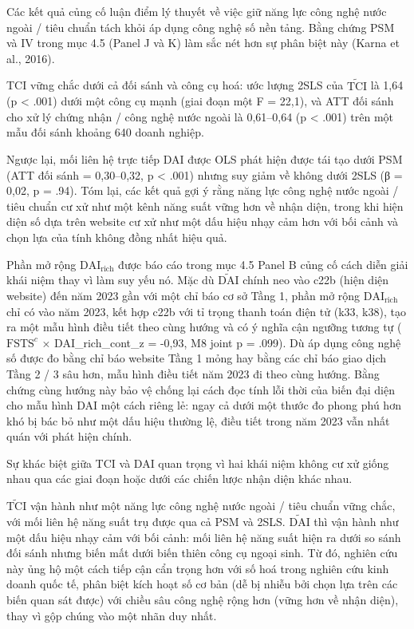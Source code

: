 \documentclass[12pt,a4paper]{article}
\begin{document}
Các kết quả củng cố luận điểm lý thuyết về việc giữ năng lực công nghệ
nước ngoài / tiêu chuẩn tách khỏi áp dụng công nghệ số nền tảng. Bằng
chứng PSM và IV trong mục 4.5 (Panel J và K) làm sắc nét hơn sự phân
biệt này (Karna et al., 2016).

TCI vững chắc dưới cả đối sánh và công cụ hoá: ước lượng 2SLS của
\(\tilde{\mathrm{TCI}}\) là 1,64 (p \textless{} .001) dưới một công cụ
mạnh (giai đoạn một F = 22,1), và ATT đối sánh cho xử lý chứng nhận /
công nghệ nước ngoài là 0,61--0,64 (p \textless{} .001) trên một mẫu đối
sánh khoảng 640 doanh nghiệp.

Ngược lại, mối liên hệ trực tiếp DAI được OLS phát hiện được tái tạo
dưới PSM (ATT đối sánh = 0,30--0,32, p \textless{} .001) nhưng suy giảm
về không dưới 2SLS (β = 0,02, p = .94). Tóm lại, các kết quả gợi ý rằng
năng lực công nghệ nước ngoài / tiêu chuẩn cư xử như một kênh năng suất
vững hơn về nhận diện, trong khi hiện diện số dựa trên website cư xử như
một dấu hiệu nhạy cảm hơn với bối cảnh và chọn lựa của tính không đồng
nhất hiệu quả.

Phần mở rộng \(\mathrm{DAI}_{\text{rich}}\) được báo cáo trong mục 4.5
Panel B củng cố cách diễn giải khái niệm thay vì làm suy yếu nó. Mặc dù
\(\tilde{\mathrm{DAI}}\) chính neo vào c22b (hiện diện website) đến năm
2023 gần với một chỉ báo cơ sở Tầng 1, phần mở rộng
\(\mathrm{DAI}_{\text{rich}}\) chỉ có vào năm 2023, kết hợp c22b với tỉ
trọng thanh toán điện tử (k33, k38), tạo ra một mẫu hình điều tiết theo
cùng hướng và có ý nghĩa cận ngưỡng tương tự (\(\mathrm{FSTS}^{c}\) ×
DAI\_rich\_cont\_z = -0,93, M8 joint p = .099). Dù áp dụng công nghệ số
được đo bằng chỉ báo website Tầng 1 mỏng hay bằng các chỉ báo giao dịch
Tầng 2 / 3 sâu hơn, mẫu hình điều tiết năm 2023 đi theo cùng hướng. Bằng
chứng cùng hướng này bảo vệ chống lại cách đọc tính lỗi thời của biến
đại diện cho mẫu hình DAI một cách riêng lẻ: ngay cả dưới một thước đo
phong phú hơn khó bị bác bỏ như một dấu hiệu thường lệ, điều tiết trong
năm 2023 vẫn nhất quán với phát hiện chính.

Sự khác biệt giữa TCI và DAI quan trọng vì hai khái niệm không cư xử
giống nhau qua các giai đoạn hoặc dưới các chiến lược nhận diện khác
nhau.

\(\tilde{\mathrm{TCI}}\) vận hành như một năng lực công nghệ nước ngoài
/ tiêu chuẩn vững chắc, với mối liên hệ năng suất trụ được qua cả PSM và
2SLS. \(\tilde{\mathrm{DAI}}\) thì vận hành như một dấu hiệu nhạy cảm
với bối cảnh: mối liên hệ năng suất hiện ra dưới so sánh đối sánh nhưng
biến mất dưới biến thiên công cụ ngoại sinh. Từ đó, nghiên cứu này ủng
hộ một cách tiếp cận cẩn trọng hơn với số hoá trong nghiên cứu kinh
doanh quốc tế, phân biệt kích hoạt số cơ bản (dễ bị nhiễu bởi chọn lựa
trên các biến quan sát được) với chiều sâu công nghệ rộng hơn (vững hơn
về nhận diện), thay vì gộp chúng vào một nhãn duy nhất.
\end{document}
